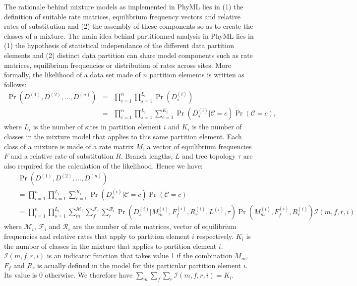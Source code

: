 \documentclass[a4paper,12pt]{article}
\begin{document}
The rationale behind mixture  models as implemented in PhyML lies in (1)  the definition of suitable
rate matrices, equilibrium frequency vectors and relative rates of substitution and (2) the assembly
of these  components so as  to create the  classes of a mixture.  The main idea  behind partitionned
analysis in  PhyML lies  in (1)  the hypothesis of  statistical independance  of the  different data
partition elements and (2) distinct data partition can share model components such as rate matrices,
equilibrium frequencies or  distribution of rates across  sites. More formally, the  likelihood of a
data set made of $n$ partition elements is written as follows:
\begin{eqnarray*}
\Pr(D^{(1)},D^{(2)},\ldots,D^{(n)}) &=& \prod_{i=1}^{n}  \prod_{s=1}^{L_i} \Pr(D^{(i)}_s) \\
&=& \prod_{i=1}^{n}  \prod_{s=1}^{L_i} \sum_{c=1}^{K_i} \Pr(D^{(i)}_s|\mathcal{C}=c) \Pr(\mathcal{C}=c),
\end{eqnarray*}
where $L_i$ is  the number of sites in partition  element $i$ and $K_i$ is the  number of classes in
the mixture model that applies to this same partition  element. Each class of a mixture is made of a
rate  matrix $M$,  a vector  of equilibrium  frequencies  $F$ and  a relative  rate of  substitution
$R$. Branch  lengths, $L$ and  tree topology $\tau$  are also required  for the calculation  of the
likelihood. Hence we have:
\begin{eqnarray*}
&& \Pr(D^{(1)},D^{(2)},\ldots,D^{(n)})  \\
&&=  \prod_{i=1}^{n}  \prod_{s=1}^{L_i} \sum_{c=1}^{K_i} \Pr(D^{(i)}_s|\mathcal{C}=c) \Pr(\mathcal{C}=c) \\
&&= \prod_{i=1}^{n}  \prod_{s=1}^{L_i} \sum_{m}^{\mathcal{M}_i} \sum_{f}^{\mathcal{F}_i} \sum_{r}^{\mathcal{R}_i}  \Pr(D^{(i)}_s|M_m^{(i)},F_f^{(i)},R_r^{(i)},L^{(i)},\tau) \Pr(M_m^{(i)},F_f^{(i)},R_r^{(i)}) \mathcal{I}(m,f,r,i)
\end{eqnarray*}
where $\mathcal{M}_i$, $\mathcal{F}_i$ and $\mathcal{R}_i$ are the number of rate matrices,
vector of equilibrium frequencies and relative rates that apply to partition element $i$
respectively. $K_i$ is the number of classes in the mixture that applies to partition element $i$. $\mathcal{I}(m,f,r,i)$ is an indicator function that takes value 1 if the combination
$M_m$, $F_f$ and $R_r$ is acually defined in the model for this particular partition element
$i$. Its value is 0 otherwise. We therefore have $\sum_m \sum_f \sum_r \mathcal{I}(m,f,r,i) = K_i$. 
\end{document}

